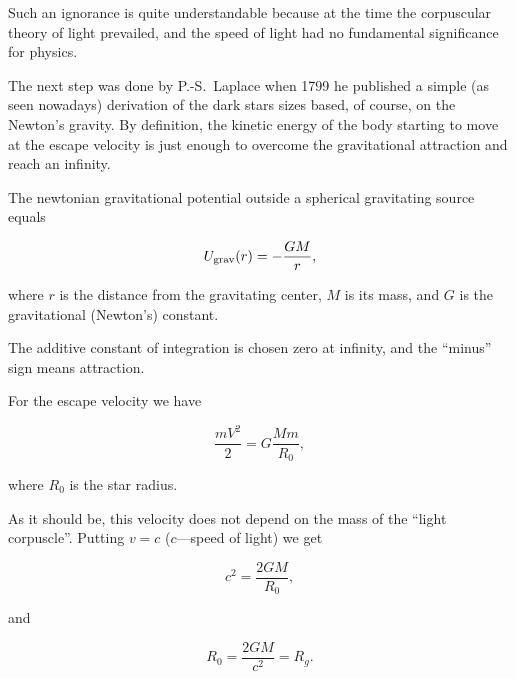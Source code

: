 Such an ignorance is quite understandable because at the time the corpuscular theory of light prevailed, and the speed of light had no fundamental significance for physics.



The next step was done by P.-S.~Laplace \cite{berez:L} when 1799 he published a simple (as seen nowadays) derivation of the dark stars sizes based, of course, on the Newton's gravity. By definition, the kinetic energy of the body starting to move at the escape velocity is  just enough to overcome the gravitational attraction and reach an infinity. 

The newtonian gravitational potential outside a spherical gravitating source equals

\begin{equation}

\label{UN}

U_{\rm grav}(r) = - \frac{G M}{r} ,\nonumber

\end{equation}

where $r$ is the distance from the gravitating center, $M$ is its mass, and $G$ is the gravitational (Newton's) constant. 

The additive constant of integration is chosen zero at infinity, and the ``minus'' sign means attraction. 

For the escape velocity we have

\begin{equation}

\label{V2}

\frac{m V^2}{2} = G \frac{M m}{R_0}, \nonumber

\end{equation}

where $R_0$ is the star radius. 

As it should be, this velocity does not depend on the mass of the ``light corpuscle''. Putting $ v = c$ ($c$---speed of light) we get

\begin{equation}

\label{vc}

c^2 = \frac{2 G M}{R_0},\nonumber

\end{equation}

and

\begin{equation}

\label{R0}

R_0 = \frac{2 G M}{c^2} = R_g.\nonumber

\end{equation}

